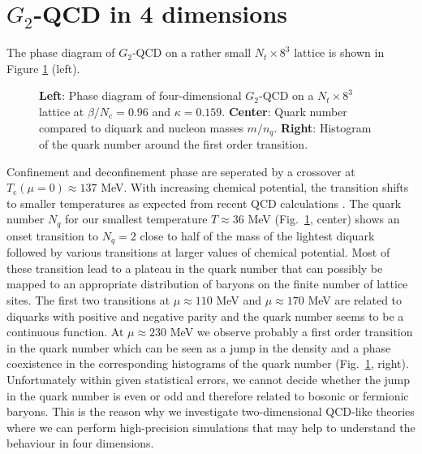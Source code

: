 \documentclass{PoS}
\begin{document}
\section{$G_2$-QCD in 4 dimensions}
\noindent
The phase diagram of $G_2$-QCD on a rather small $N_t\times8^3$ lattice is shown in Figure \ref{PDG2D4} (left).
\begin{figure}[htb]
    \scalebox{0.71}{}
     \scalebox{0.71}{}
     \scalebox{0.71}{}
  \caption{\textbf{Left}: Phase diagram of four-dimensional $G_2$-QCD on a $N_t\times 8^3$ lattice at $\beta/N_\text{c}=0.96$ and $\kappa=0.159$. \textbf{Center}: Quark number compared to diquark and nucleon masses $m/n_q$. \textbf{Right}: Histogram of the quark number around the first order transition.} 
     \label{PDG2D4}
   \end{figure}
Confinement and deconfinement phase are seperated by a crossover at $T_\text{c}(\mu=0)\approx 137$ MeV. With increasing chemical potential, the transition shifts to smaller temperatures as expected from
recent QCD calculations \cite{Cea:2015cya}. The quark number $N_q$ for our smallest temperature $T\approx 36$ MeV (Fig.~\ref{PDG2D4}, center) shows an onset transition to $N_q=2$ close 
to half of the mass of the lightest diquark followed by various transitions at larger values of chemical potential. Most of these transition lead to a plateau in the quark number that can possibly be mapped
to an appropriate distribution of baryons on the finite number of lattice sites. The first two transitions at $\mu\approx 110$ MeV and $\mu\approx 170$ MeV are related to diquarks with positive and negative parity and the quark number seems to be 
a continuous function. At $\mu \approx 230$ MeV we observe probably a first order transition in the quark number which can be seen as a jump in the density and a phase coexistence in the corresponding
histograms of the quark number (Fig.~\ref{PDG2D4}, right). Unfortunately within given statistical errors, we cannot decide whether the jump in the quark number is even or odd and therefore related to
bosonic or fermionic baryons. This is the reason why we investigate two-dimensional QCD-like theories where we can perform high-precision simulations that may help to understand the behaviour in four dimensions.
\end{document}
